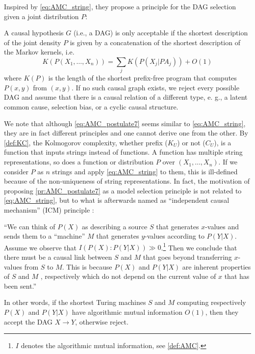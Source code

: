 Inspired by \cref{eq:AMC_string}, they propose a principle for the DAG selection given a joint distribution $P$:
\begin{principle}\citep[Postulate 7]{janzing2010causal}\label{pr:AMC_postulate7}
A causal hypothesis $G$ (i.e., a DAG) is only acceptable if the shortest description of the joint
density $P$ is given by a concatenation of the shortest description of the Markov kernels, i.e. 
\begin{equation}\label{eq:AMC_postulate7}
    K(P(X_1,\ldots,X_n))=\sum_jK(P(X_j|PA_j))+O(1)
\end{equation}
where $K(P)$ is the length of the shortest prefix-free program that computes $P(x, y)$ from $(x, y)$.
If no such causal graph exists, we reject every possible DAG and assume that there is a causal relation of a different type, e. g., a latent common cause, selection bias, or a cyclic causal structure.
\end{principle}
We note that although \cref{eq:AMC_postulate7} seems similar to \cref{eq:AMC_string}, they are in fact different principles and one cannot derive one from the other. By \cref{def:KC}, the Kolmogorov complexity, whether prefix ($K_U$) or not ($C_U$), is a function that inputs strings instead of functions. A function has multiple string representations, so does a function or distribution $P$ over $(X_1,\ldots,X_n)$. If we consider $P$ as $n$ strings and apply \cref{eq:AMC_string} to them, this is ill-defined because of the non-uniqueness of string representations. In fact, the motivation of proposing \cref{pr:AMC_postulate7} as a model selection principle is not related to \cref{eq:AMC_string}, but to what is afterwards named as ``independent causal mechanism'' (ICM) principle \citep{peters2017elements}:

``We can think of $P(X)$ as describing a source $S$ that generates $x$-values and sends them to a ``machine'' $M$ that generates $y$-values according to $P (Y |X)$. Assume we observe that $I(P(X): P(Y|X)) \gg 0$.\footnote{$I$ denotes the algorithmic mutual information, see \cref{def:AMC}.} Then we conclude that there must be a causal link between $S$ and $M$ that goes beyond transferring $x$-values from $S$ to $M$. This is because $P (X)$ and $P (Y |X)$ are inherent properties of $S$ and $M$ , respectively which do not depend on the current value of $x$ that has been sent.'' \citep[Sec. 3.1]{janzing2010causal}

In other words, if the shortest Turing machines $S$ and $M$ computing respectively $P(X)$ and $P(Y|X)$ have algorithmic mutual information $O(1)$, then they accept the DAG $X\to Y$, otherwise reject.

